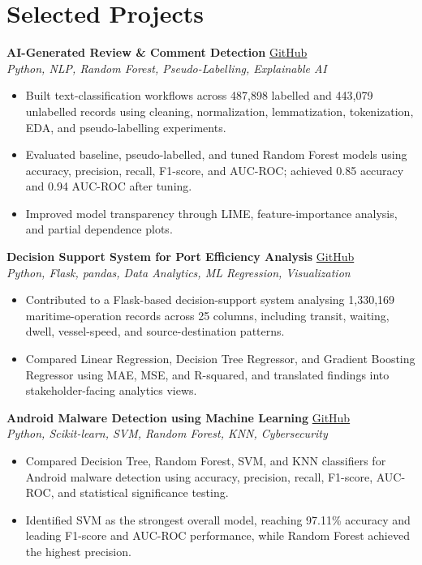 \documentclass[10pt,a4paper]{article}
\newcommand{\projectHeading}[3]{
    \Needspace{7\baselineskip}
    \textbf{#1} \hfill \href{#2}{GitHub}\\[-1pt]
    \textit{#3}
    \vspace{-2pt}
}
\begin{document}
\section{Selected Projects}

\projectHeading
{AI-Generated Review \& Comment Detection}
{https://github.com/veera491/ai-generated-review-detection}
{Python, NLP, Random Forest, Pseudo-Labelling, Explainable AI}
\begin{itemize}
    \item Built text-classification workflows across 487,898 labelled and 443,079 unlabelled records using cleaning, normalization, lemmatization, tokenization, EDA, and pseudo-labelling experiments.
    \item Evaluated baseline, pseudo-labelled, and tuned Random Forest models using accuracy, precision, recall, F1-score, and AUC-ROC; achieved 0.85 accuracy and 0.94 AUC-ROC after tuning.
    \item Improved model transparency through LIME, feature-importance analysis, and partial dependence plots.
\end{itemize}

\projectHeading
{Decision Support System for Port Efficiency Analysis}
{https://github.com/veera491/port-efficiency-decision-support-system}
{Python, Flask, pandas, Data Analytics, ML Regression, Visualization}
\begin{itemize}
    \item Contributed to a Flask-based decision-support system analysing 1,330,169 maritime-operation records across 25 columns, including transit, waiting, dwell, vessel-speed, and source-destination patterns.
    \item Compared Linear Regression, Decision Tree Regressor, and Gradient Boosting Regressor using MAE, MSE, and R-squared, and translated findings into stakeholder-facing analytics views.
\end{itemize}

\projectHeading
{Android Malware Detection using Machine Learning}
{https://github.com/veera491/android-malware-detection-ml}
{Python, Scikit-learn, SVM, Random Forest, KNN, Cybersecurity}
\begin{itemize}
    \item Compared Decision Tree, Random Forest, SVM, and KNN classifiers for Android malware detection using accuracy, precision, recall, F1-score, AUC-ROC, and statistical significance testing.
    \item Identified SVM as the strongest overall model, reaching 97.11\% accuracy and leading F1-score and AUC-ROC performance, while Random Forest achieved the highest precision.
\end{itemize}
\end{document}

